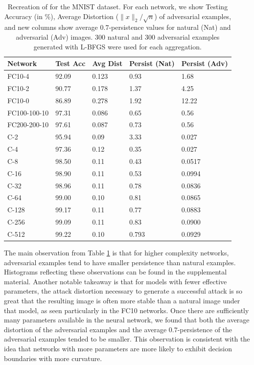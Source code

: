 \begin{table}[ht]
\centering
\caption{Recreation of \citet[Table 1]{szegedy2013} for the MNIST dataset.  For each network, we show Testing Accuracy (in \%), Average Distortion ($\|x\|_2/\sqrt{n}$) of adversarial examples, and new columns show average $0.7$-persistence values for natural (Nat) and adversarial (Adv) images. 300 natural and 300 adversarial examples generated with L-BFGS were used for each aggregation.}
\label{table1}
\begin{tabular}{lllll}
\toprule
Network & Test Acc & Avg Dist & Persist (Nat) & Persist (Adv) \\
\midrule
FC10-4 & 92.09 & 0.123 & 0.93 & 1.68\\
FC10-2 & 90.77 & 0.178 & 1.37 & 4.25\\
FC10-0 & 86.89 & 0.278 & 1.92 & 12.22\\
FC100-100-10 & 97.31 & 0.086 & 0.65 & 0.56 \\
FC200-200-10 & 97.61 & 0.087 & 0.73 & 0.56 \\
\midrule
C-2 & 95.94 & 0.09 & 3.33 & 0.027 \\
C-4 & 97.36 & 0.12 & 0.35 & 0.027 \\
C-8 & 98.50 & 0.11 & 0.43  & 0.0517 \\
C-16 & 98.90 & 0.11 & 0.53 & 0.0994 \\
C-32 & 98.96 & 0.11 & 0.78 & 0.0836 \\
C-64 & 99.00 & 0.10 & 0.81 & 0.0865 \\
C-128 & 99.17 & 0.11 & 0.77 & 0.0883 \\
C-256 & 99.09 & 0.11  & 0.83 & 0.0900 \\
C-512 & 99.22 & 0.10 & 0.793 & 0.0929 \\

\bottomrule
\end{tabular}
\end{table}

The main observation from Table \ref{table1} is that for higher complexity networks,
adversarial examples tend to have smaller persistence than natural examples. Histograms reflecting these observations can be found in the supplemental material. %
Another notable takeaway is that for models with fewer effective parameters, the attack distortion necessary to generate a successful attack is so great that the resulting image is often more stable than a natural image under that model, as seen particularly in the FC10 networks. Once there are sufficiently many parameters available in the neural network, we found that both the average distortion of the adversarial examples and the average $0.7$-persistence of the adversarial examples tended to be smaller. This observation is consistent with the idea that networks with more parameters are more likely to exhibit decision boundaries with more curvature.

